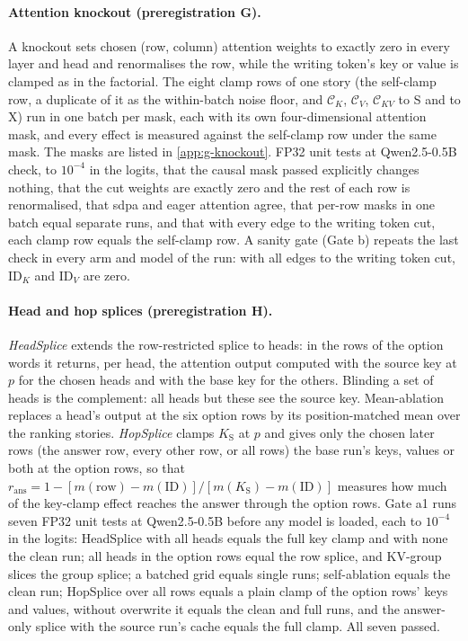 \paragraph{Attention knockout (preregistration G).} A knockout sets chosen (row, column) attention weights to exactly zero in every layer and head and renormalises the row, while the writing token's key or value is clamped as in the factorial. The eight clamp rows of one story (the self-clamp row, a duplicate of it as the within-batch noise floor, and $\mathcal{C}_K$, $\mathcal{C}_V$, $\mathcal{C}_{KV}$ to S and to X) run in one batch per mask, each with its own four-dimensional attention mask, and every effect is measured against the self-clamp row under the same mask. The masks are listed in \cref{app:g-knockout}. FP32 unit tests at Qwen2.5-0.5B check, to $10^{-4}$ in the logits, that the causal mask passed explicitly changes nothing, that the cut weights are exactly zero and the rest of each row is renormalised, that sdpa and eager attention agree, that per-row masks in one batch equal separate runs, and that with every edge to the writing token cut, each clamp row equals the self-clamp row. A sanity gate (Gate b) repeats the last check in every arm and model of the run: with all edges to the writing token cut, $\mathrm{ID}_K$ and $\mathrm{ID}_V$ are zero.

\paragraph{Head and hop splices (preregistration H).} \emph{HeadSplice} extends the row-restricted splice to heads: in the rows of the option words it returns, per head, the attention output computed with the source key at $p$ for the chosen heads and with the base key for the others. Blinding a set of heads is the complement: all heads but these see the source key. Mean-ablation replaces a head's output at the six option rows by its position-matched mean over the ranking stories. \emph{HopSplice} clamps $K_{\mathrm{S}}$ at $p$ and gives only the chosen later rows (the answer row, every other row, or all rows) the base run's keys, values or both at the option rows, so that $r_{\mathrm{ans}} = 1 - [m(\text{row}) - m(\mathrm{ID})]/[m(K_{\mathrm{S}}) - m(\mathrm{ID})]$ measures how much of the key-clamp effect reaches the answer through the option rows. Gate a1 runs seven FP32 unit tests at Qwen2.5-0.5B before any model is loaded, each to $10^{-4}$ in the logits: HeadSplice with all heads equals the full key clamp and with none the clean run; all heads in the option rows equal the row splice, and KV-group slices the group splice; a batched grid equals single runs; self-ablation equals the clean run; HopSplice over all rows equals a plain clamp of the option rows' keys and values, without overwrite it equals the clean and full runs, and the answer-only splice with the source run's cache equals the full clamp. All seven passed.


